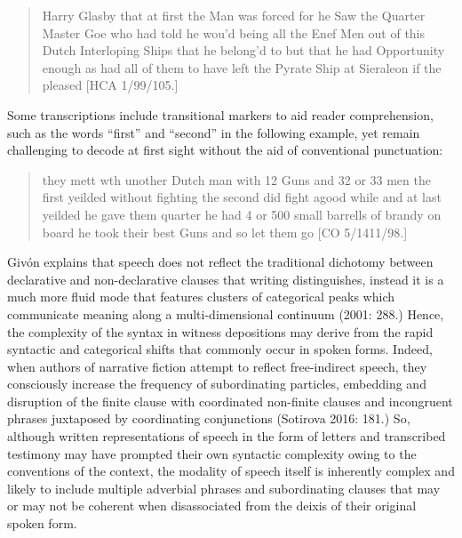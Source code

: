 \begin{quotation}
Harry Glasby that at first the Man was forced for he Saw the Quarter Master Goe who had told he wou’d being all the Enef Men out of this Dutch Interloping Ships that he belong’d to but that he had Opportunity enough as had all of them to have left the Pyrate Ship at Sieraleon if the pleased [HCA 1/99/105.]

\end{quotation}
\begin{styleStandard}
Some transcriptions include transitional markers to aid reader comprehension, such as the words “first” and “second” in the following example, yet remain challenging to decode at first sight without the aid of conventional punctuation: 
\end{styleStandard}


\begin{quotation}
they mett wth unother Dutch man with 12 Guns and 32 or 33 men the first yeilded without fighting the second did fight agood while and at last yeilded he gave them quarter he had 4 or 500 small barrells of brandy on board he took their best Guns and so let them go [CO 5/1411/98.]

\end{quotation}
\begin{styleStandard}
Givón explains that speech does not reflect the traditional dichotomy between declarative and non-declarative clauses that writing distinguishes, instead it is a much more fluid mode that features clusters of categorical peaks which communicate meaning along a multi-dimensional continuum (2001: 288.) Hence, the complexity of the syntax in witness depositions may derive from the rapid syntactic and categorical shifts that commonly occur in spoken forms. Indeed, when authors of narrative fiction attempt to reflect free-indirect speech, they consciously increase the frequency of subordinating particles, embedding and disruption of the finite clause with coordinated non-finite clauses and incongruent phrases juxtaposed by coordinating conjunctions (Sotirova 2016: 181.) So, although written representations of speech in the form of letters and transcribed testimony may have prompted their own syntactic complexity owing to the conventions of the context, the modality of speech itself is inherently complex and likely to include multiple adverbial phrases and subordinating clauses that may or may not be coherent when disassociated from the deixis of their original spoken form. \ \ 
\end{styleStandard}


